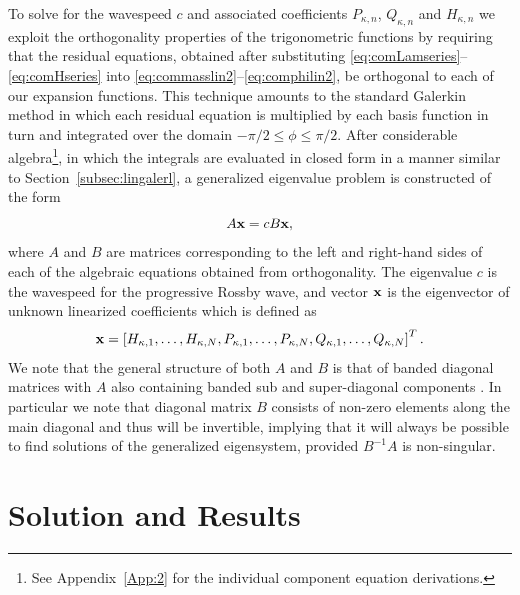 To solve for the wavespeed $c$ and associated coefficients $P_{\kappa,n}$, $Q_{\kappa,n}$ and $H_{\kappa,n}$ we exploit the orthogonality properties of the trigonometric functions by requiring that the residual equations, obtained after substituting \eqref{eq:comLamseries}--\eqref{eq:comHseries} into \eqref{eq:commasslin2}--\eqref{eq:comphilin2}, be orthogonal to each of our expansion functions. This technique amounts to the standard Galerkin method in which each residual equation is multiplied by each basis function in turn and integrated over the domain $-\pi/2 \le \phi \le \pi/2$. After considerable algebra\footnote{See Appendix~\ref{App:2} for the individual component equation derivations.}, in which the integrals are evaluated in closed form in a manner similar to Section~\ref{subsec:lingalerl}, a generalized eigenvalue problem is constructed of the form
\begin{equation}
A \mathbf{x}=cB\mathbf{x},
\label{eq:geneigen}
\end{equation}
where $A$ and $B$ are matrices corresponding to the left and right-hand sides of each of the algebraic equations obtained from orthogonality. The eigenvalue $c$ is the wavespeed for the progressive Rossby wave, and vector $\mathbf{x}$ is the eigenvector of unknown linearized coefficients which is defined as
\begin{equation}
\mathbf{x} = \left[H_{\kappa,1}, \ldots, H_{\kappa,N}, P_{\kappa,1}, \ldots, P_{\kappa,N}, Q_{\kappa,1}, \ldots, Q_{\kappa,N} \right]^{T}.
\label{eq:eigvec}
\end{equation}
We note that the general structure of both $A$ and $B$ is that of banded diagonal matrices with $A$ also containing banded sub and super-diagonal components . In particular we note that diagonal matrix $B$ consists of non-zero elements along the main diagonal and thus will be invertible, implying that it will always be possible to find solutions of the generalized eigensystem, provided $B^{-1} A$ is non-singular.



\section{Solution and Results}
